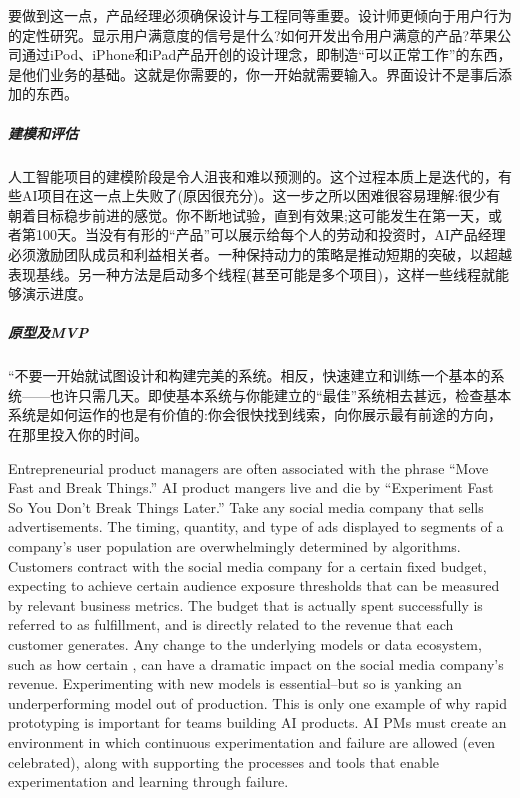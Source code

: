 \documentclass[letterpaper,10pt,english]{sphinxmanual}
\begin{document}
要做到这一点，产品经理必须确保设计与工程同等重要。设计师更倾向于用户行为的定性研究。显示用户满意度的信号是什么?如何开发出令用户满意的产品?苹果公司通过iPod、iPhone和iPad产品开创的设计理念，即制造“可以正常工作”的东西，是他们业务的基础。这就是你需要的，你一开始就需要输入。界面设计不是事后添加的东西。


\subparagraph{建模和评估}
\label{\detokenize{chapter_project/process:id23}}
人工智能项目的建模阶段是令人沮丧和难以预测的。这个过程本质上是迭代的，有些AI项目在这一点上失败了(原因很充分)。这一步之所以困难很容易理解:很少有朝着目标稳步前进的感觉。你不断地试验，直到有效果;这可能发生在第一天，或者第100天。当没有有形的“产品”可以展示给每个人的劳动和投资时，AI产品经理必须激励团队成员和利益相关者。一种保持动力的策略是推动短期的突破，以超越表现基线。另一种方法是启动多个线程(甚至可能是多个项目)，这样一些线程就能够演示进度。


\subparagraph{原型及MVP}
\label{\detokenize{chapter_project/process:mvp}}
“不要一开始就试图设计和构建完美的系统。相反，快速建立和训练一个基本的系统——也许只需几天。即使基本系统与你能建立的“最佳”系统相去甚远，检查基本系统是如何运作的也是有价值的:你会很快找到线索，向你展示最有前途的方向，在那里投入你的时间。
%
\begin{footnote}[801]\sphinxAtStartFootnote
{}
%
\end{footnote}

Entrepreneurial product managers are often associated with the phrase
“Move Fast and Break Things.” AI product mangers live and die by
“Experiment Fast So You Don’t Break Things Later.” Take any social media
company that sells advertisements. The timing, quantity, and type of ads
displayed to segments of a company’s user population are overwhelmingly
determined by algorithms. Customers contract with the social media
company for a certain fixed budget, expecting to achieve certain
audience exposure thresholds that can be measured by relevant business
metrics. The budget that is actually spent successfully is referred to
as fulfillment, and is directly related to the revenue that each
customer generates. Any change to the underlying models or data
ecosystem, such as how certain ,
can have a dramatic impact on the social media company’s revenue.
Experimenting with new models is essential–but so is yanking an
underperforming model out of production. This is only one example of why
rapid prototyping is important for teams building AI products. AI PMs
must create an environment in which continuous experimentation and
failure are allowed (even celebrated), along with supporting the
processes and tools that enable experimentation and learning through
failure.
\end{document}
